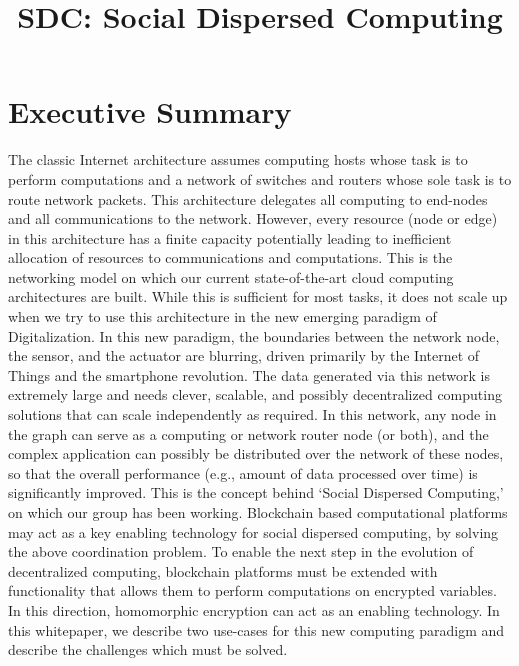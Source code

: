 \documentclass[12pt,letterpaper]{article}
\title{SDC: Social Dispersed Computing}
\date{}
\begin{document}


\maketitle

\section*{Executive Summary}

The classic Internet architecture assumes computing hosts whose task is to perform computations
and a network of switches and routers whose sole task is to route network packets. This architecture delegates all computing to end-nodes and all communications to the network. However, every resource (node or edge) in this architecture has a finite capacity potentially leading to inefficient allocation of resources to communications and computations.  This is the networking model on which our current state-of-the-art cloud computing architectures are built. While this is sufficient for most tasks, it does not scale up when we try to use this architecture in the new emerging paradigm of Digitalization. In this new paradigm, the boundaries between the network node, the sensor, and the actuator are blurring, driven primarily by the Internet of Things and the smartphone revolution. The data generated via this network is extremely large and needs clever, scalable, and possibly decentralized computing solutions that can scale independently as required. In this network, any node in the graph can serve as a computing or network
router node (or both), and  the complex application can possibly be distributed over the network
of these nodes, so that the overall performance (e.g., amount of data processed over
time) is significantly improved.  This is the concept behind `Social Dispersed Computing,' on which our group has been working. 
Blockchain based computational platforms may act as a key enabling technology for social dispersed computing, by solving the above coordination problem. 
To enable the next step in the evolution of decentralized computing, blockchain platforms must be extended with functionality that allows them to perform computations on encrypted variables.
In this direction, homomorphic encryption can act as an enabling technology. In this whitepaper, we describe two use-cases for this new computing paradigm and describe the challenges which must be solved.
\end{document}
